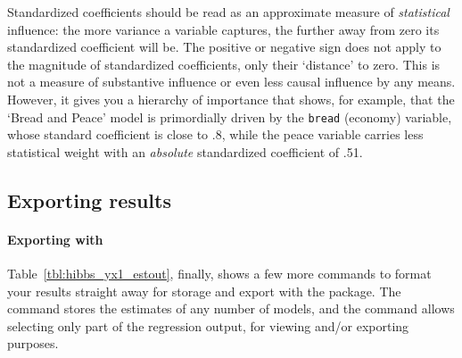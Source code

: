	Standardized coefficients should be read as an approximate measure of \emph{statistical} influence: the more variance a variable captures, the further away from zero its standardized coefficient will be. The positive or negative sign does not apply to the magnitude of standardized coefficients, only their `distance' to zero. This is not a measure of substantive influence or even less causal influence by any means. However, it gives you a hierarchy of importance that shows, for example, that the `Bread and Peace' model is primordially driven by the \texttt{bread} (economy) variable, whose standard coefficient is close to .8, while the peace variable carries less statistical weight with an \emph{absolute} standardized coefficient of .51.
  
	\subsection{Exporting results}


\paragraph{Exporting with }%

Table~\ref{tbl:hibbs_yx1_estout}, finally, shows a few more commands to format your results straight away for storage and export with the  package. The  command stores the estimates of any number of models, and the  command allows selecting only part of the regression output, for viewing and/or exporting purposes.

